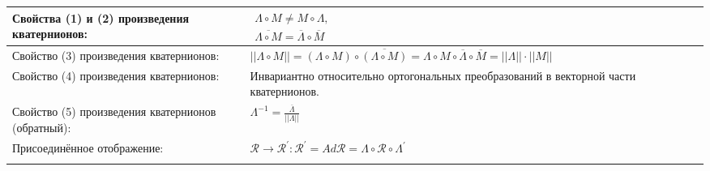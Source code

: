 \documentclass{article}
\begin{document}
\begin{tabular}{ |p{3.8cm}|p{5.7cm}|p{6cm}|p{3.5cm}|  }
\hline
Свойства (1) и (2) произведения кватернионов:                                &  %
$\begin{aligned}
\Lambda \circ M \neq M \circ \Lambda,      \\
\overline{\Lambda \circ M} = \overline{\Lambda} \circ \overline{M}
\end{aligned}$                                                               &  %
                                                                             &  %
                                                                             \\ %
\hline
Свойство (3) произведения кватернионов:                                      &  %
$||\Lambda \circ M|| =
 (\Lambda \circ M) \circ \overline{(\Lambda \circ M)} =
 \Lambda \circ M \circ \overline{\Lambda} \circ \overline{M} =
 ||\Lambda|| \cdot ||M||$                                                    &  %
                                                                             &  %
                                                                             \\ %
\hline
Свойство (4) произведения кватернионов:                                      &  %
Инвариантно относительно ортогональных преобразований в векторной
 части кватернионов.                                                         &  %
                                                                             &  %
                                                                             \\ %
\hline
Свойство (5) произведения кватернионов (обратный):                           &  %
$\Lambda^{-1} = \frac{\overline{\Lambda}}{||\Lambda||}$                      &  %
                                                                             &  %
                                                                             \\ %
\hline
Присоединённое отображение:                                                  &  %
$\mathcal{R} \rightarrow \mathcal{R}^{\prime}:
\mathcal{R}^{\prime} = Ad \mathcal{R} =
\Lambda \circ \mathcal{R} \circ \Lambda^{\prime}$                            &  %
                                                                             &  %
                                                                             \\ %
\hline
                                                                             &  %

\end{tabular}
\end{document}
